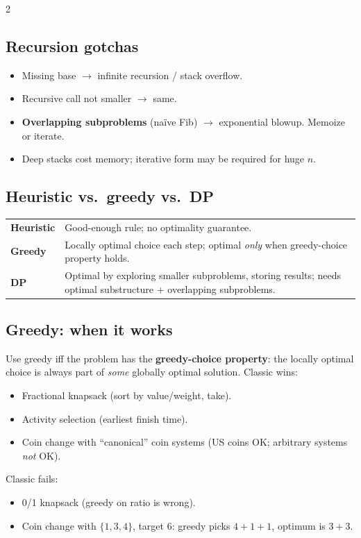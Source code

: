 \documentclass[10pt]{article}
\begin{document}
\begin{multicols}{2}
\subsection*{Recursion gotchas}
\begin{itemize}
    \item Missing base $\to$ infinite recursion / stack overflow.
    \item Recursive call not smaller $\to$ same.
    \item \textbf{Overlapping subproblems} (na\"ive Fib) $\to$
    exponential blowup. Memoize or iterate.
    \item Deep stacks cost memory; iterative form may be required for
    huge $n$.
\end{itemize}

\subsection*{Heuristic vs.\ greedy vs.\ DP}
\begin{tabular}{@{}lp{3.5cm}@{}}
\textbf{Heuristic} & Good-enough rule; no optimality guarantee.\\
\textbf{Greedy}    & Locally optimal choice each step; optimal \emph{only}
when greedy-choice property holds.\\
\textbf{DP}        & Optimal by exploring smaller subproblems, storing
results; needs optimal substructure + overlapping subproblems.
\end{tabular}

\columnbreak

\subsection*{Greedy: when it works}
Use greedy iff the problem has the \textbf{greedy-choice property}: the
locally optimal choice is always part of \emph{some} globally optimal
solution. Classic wins:
\begin{itemize}
    \item Fractional knapsack (sort by value/weight, take).
    \item Activity selection (earliest finish time).
    \item Coin change with ``canonical'' coin systems (US coins OK;
    arbitrary systems \emph{not} OK).
\end{itemize}
Classic fails:
\begin{itemize}
    \item 0/1 knapsack (greedy on ratio is wrong).
    \item Coin change with $\{1, 3, 4\}$, target 6: greedy picks $4{+}1{+}1$,
    optimum is $3{+}3$.
\end{itemize}


\end{multicols}
\end{document}
